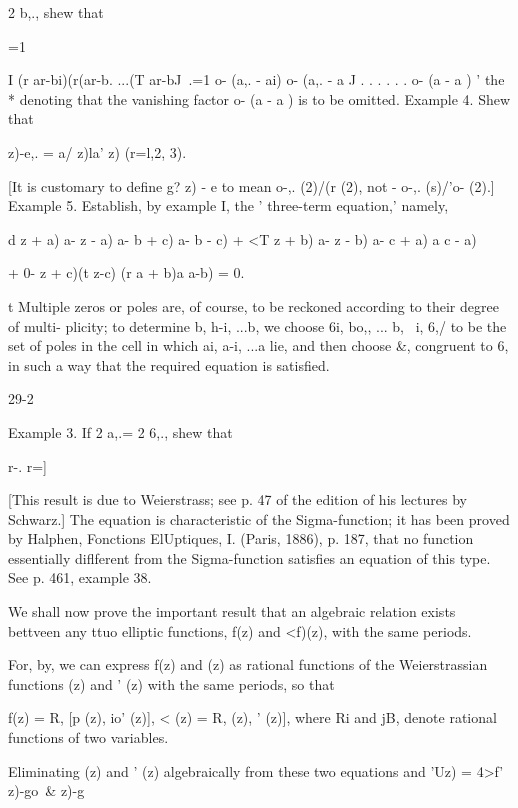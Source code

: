 {2 b,., shew that

=1

I (r ar-bi)(r(ar-b. ...(T ar-bJ \,.=1 o- (a,. - ai) o- (a,. - a J . .
. . . . o- (a - a ) ' the * denoting that the vanishing factor o- (a -
a ) is to be omitted. Example 4. Shew that

  z)-e,. = a/ z)la' z) (r=l,2, 3).

[It is customary to define g? z) - e to mean o-,. (2)/(r (2), not -
o-,. (s)/'o- (2).] Example 5. Establish, by example I, the '
three-term equation,' namely,

d z + a) a- z - a) a- b + c) a- b - c) + <T z + b) a- z - b) a- c + a)
a c - a)

+ 0- z + c)(t z-c) (r a + b)a a-b) = 0.

t Multiple zeros or poles are, of course, to be reckoned according to
their degree of multi- plicity; to determine b, h-i, ...b, we
choose 6i, bo,, ... b, \ i, 6,/ to be the set of poles in the cell
in which ai, a-i, ...a lie, and then choose \&, congruent to 6, in
such a way that the required equation is satisfied.

29-2

Example 3. If 2 a,.= 2 6,., shew that

r-. r=]

%
%

[This result is due to Weierstrass; see p. 47 of the edition of his
lectures by Schwarz.] The equation is characteristic of the
Sigma-function; it has been proved by Halphen, Fonctions ElUptiques,
I. (Paris, 1886), p. 187, that no function essentially diflferent from
the Sigma-function satisfies an equation of this type. See p. 461,
example 38.


We shall now prove the important result that an algebraic relation
exists bettveen any ttuo elliptic functions, f(z) and <f)(z), with the
same periods.

For, by, we can express f(z) and (z) as rational functions of
the Weierstrassian functions (z) and ' (z) with the same periods, so
that

f(z) = R, [p (z), io' (z)], < (z) = R, (z), ' (z)], where Ri and jB,
denote rational functions of two variables.

Eliminating (z) and ' (z) algebraically from these two equations and
'Uz) = 4>f' z)-go\ \& z)-g

}
